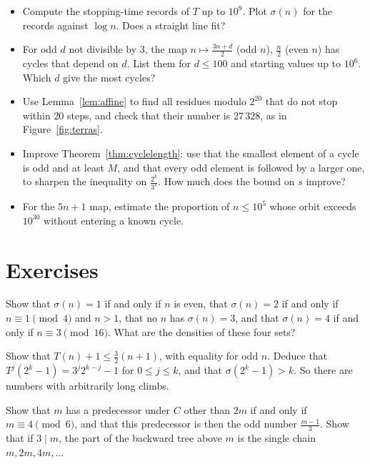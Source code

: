 \begin{itemize}
\item Compute the stopping-time records of $T$ up to $10^9$. Plot $\sigma(n)$ for the records against $\log n$. Does a straight line fit?
\item For odd $d$ not divisible by $3$, the map $n\mapsto\frac{3n+d}2$ (odd $n$), $\frac n2$ (even $n$) has cycles that depend on $d$. List them for
$d\le100$ and starting values up to $10^6$. Which $d$ give the most cycles?
\item Use Lemma~\ref{lem:affine} to find all residues modulo $2^{20}$ that do not stop within $20$ steps, and check that their number is $27\,328$, as in
Figure~\ref{fig:terras}.
\item Improve Theorem~\ref{thm:cyclelength}: use that the smallest element of a cycle is odd and at least $M$, and that every odd element is followed by a
larger one, to sharpen the inequality on $\frac{2^k}{3^s}$. How much does the bound on $s$ improve?
\item For the $5n+1$ map, estimate the proportion of $n\le10^5$ whose orbit exceeds $10^{30}$ without entering a known cycle.
\end{itemize}

\section{Exercises}

\begin{exercise}[$\star$]\label{ex:stopsmall}
Show that $\sigma(n)=1$ if and only if $n$ is even, that $\sigma(n)=2$ if and only if $n\equiv1\pmod4$ and $n>1$, that no $n$ has $\sigma(n)=3$, and that
$\sigma(n)=4$ if and only if $n\equiv3\pmod{16}$. What are the densities of these four sets?
\end{exercise}

\begin{exercise}[$\star$]\label{ex:climb}
Show that $T(n)+1\le\frac32(n+1)$, with equality for odd $n$. Deduce that $T^j(2^k-1)=3^j2^{k-j}-1$ for $0\le j\le k$, and that $\sigma(2^k-1)>k$. So there
are numbers with arbitrarily long climbs.
\end{exercise}

\begin{exercise}[$\star$]\label{ex:backward}
Show that $m$ has a predecessor under $C$ other than $2m$ if and only if $m\equiv4\pmod6$, and that this predecessor is then the odd number $\frac{m-1}3$.
Show that if $3\mid m$, the part of the backward tree above $m$ is the single chain $m,2m,4m,\dots$
\end{exercise}

